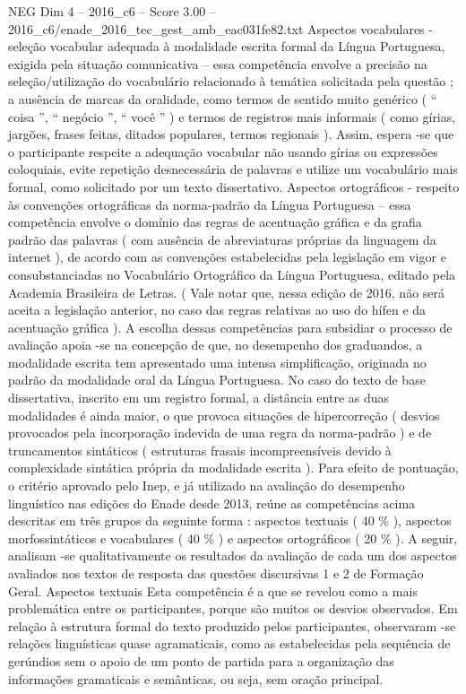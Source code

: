 \begin{textsample}{NEG Dim 4 – 2016\_c6 – Score 3.00 – 2016\_c6/enade\_2016\_tec\_gest\_amb\_eac031fe82.txt}
Aspectos vocabulares - seleção vocabular adequada à modalidade escrita formal da Língua Portuguesa, exigida pela situação comunicativa – essa competência envolve a precisão na seleção/utilização do vocabulário relacionado à temática solicitada pela questão ; a ausência de marcas da oralidade, como termos de sentido muito genérico ( “ coisa ”, “ negócio ”, “ você ” ) e termos de registros mais informais ( como gírias, jargões, frases feitas, ditados populares, termos regionais ).
Assim, espera -se que o participante respeite a adequação vocabular não usando gírias ou expressões coloquiais, evite repetição desnecessária de palavras e utilize um vocabulário mais formal, como solicitado por um texto dissertativo.
Aspectos ortográficos - respeito às convenções ortográficas da norma-padrão da Língua Portuguesa – essa competência envolve o domínio das regras de acentuação gráfica e da grafia padrão das palavras ( com ausência de abreviaturas próprias da linguagem da internet ), de acordo com as convenções estabelecidas pela legislação em vigor e consubstanciadas no Vocabulário Ortográfico da Língua Portuguesa, editado pela Academia Brasileira de Letras. ( Vale notar que, nessa edição de 2016, não será aceita a legislação anterior, no caso das regras relativas ao uso do hífen e da acentuação gráfica ).
A escolha dessas competências para subsidiar o processo de avaliação apoia -se na concepção de que, no desempenho dos graduandos, a modalidade escrita tem apresentado uma intensa simplificação, originada no padrão da modalidade oral da Língua Portuguesa.
No caso do texto de base dissertativa, inscrito em um registro formal, a distância entre as duas modalidades é ainda maior, o que provoca situações de hipercorreção ( desvios provocados pela incorporação indevida de uma regra da norma-padrão ) e de truncamentos sintáticos ( estruturas frasais incompreensíveis devido à complexidade sintática própria da modalidade escrita ).
Para efeito de pontuação, o critério aprovado pelo Inep, e já utilizado na avaliação do desempenho linguístico nas edições do Enade desde 2013, reúne as competências acima descritas em três grupos da seguinte forma : aspectos textuais ( 40 \% ), aspectos morfossintáticos e vocabulares ( 40 \% ) e aspectos ortográficos ( 20 \% ).
A seguir, analisam -se qualitativamente os resultados da avaliação de cada um dos aspectos avaliados nos textos de resposta das questões discursivas 1 e 2 de Formação Geral.
Aspectos textuais Esta competência é a que se revelou como a mais problemática entre os participantes, porque são muitos os desvios observados.
Em relação à estrutura formal do texto produzido pelos participantes, observaram -se relações linguísticas quase agramaticais, como as estabelecidas pela sequência de gerúndios sem o apoio de um ponto de partida para a organização das informações gramaticais e semânticas, ou seja, sem oração principal.

\end{textsample}
